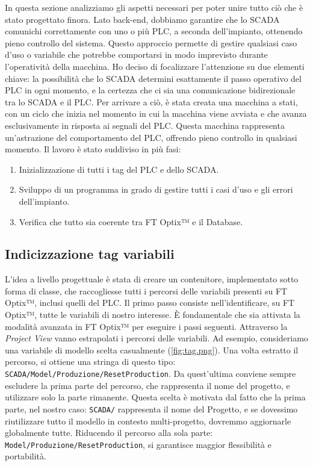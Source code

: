 In questa sezione analizziamo gli aspetti necessari per poter unire tutto ciò che è stato progettato finora. Lato back-end, dobbiamo garantire che lo SCADA comunichi correttamente con uno o più PLC, a seconda dell'impianto, ottenendo pieno controllo del sistema. Questo approccio permette di gestire qualsiasi caso d'uso o variabile che potrebbe comportarsi in modo imprevisto durante l'operatività della macchina. Ho deciso di focalizzare l'attenzione su due elementi chiave: la possibilità che lo SCADA determini esattamente il passo operativo del PLC in ogni momento, e la certezza che ci sia una comunicazione bidirezionale tra lo SCADA e il PLC. Per arrivare a ciò, è stata creata una macchina a stati, con un ciclo che inizia nel momento in cui la macchina viene avviata e che avanza esclusivamente in risposta ai segnali del PLC. Questa macchina rappresenta un'astrazione del comportamento del PLC, offrendo pieno controllo in qualsiasi momento. Il lavoro è stato suddiviso in più fasi:
\begin{enumerate}
    \item Inizializzazione di tutti i tag del PLC e dello SCADA.
    \item Sviluppo di un programma in grado di gestire tutti i casi d'uso e gli errori dell'impianto.
    \item Verifica che tutto sia coerente tra FT Optix™ e il Database.
\end{enumerate}

\subsection{Indicizzazione tag variabili}

L'idea a livello progettuale è stata di creare un contenitore, implementato sotto forma di classe, che raccogliesse tutti i percorsi delle variabili presenti su FT Optix™, inclusi quelli del PLC. Il primo passo consiste nell'identificare, su FT Optix™, tutte le variabili di nostro interesse. È fondamentale che sia attivata la modalità avanzata in FT Optix™ per eseguire i passi seguenti. Attraverso la \textit{Project View} vanno estrapolati i percorsi delle variabili. Ad esempio, consideriamo una variabile di modello scelta casualmente (\ref{fig:tag.png}). Una volta estratto il percorso, si ottiene una stringa di questo tipo: \verb|SCADA/Model/Produzione/ResetProduction|. Da quest'ultima conviene sempre escludere la prima parte del percorso, che rappresenta il nome del progetto, e utilizzare solo la parte rimanente. Questa scelta è motivata dal fatto che la prima parte, nel nostro caso: \verb|SCADA/| rappresenta il nome del Progetto, e se dovessimo riutilizzare tutto il modello in contesto multi-progetto, dovremmo aggiornarle globalmente tutte. Riducendo il percorso alla sola parte: \verb|Model/Produzione/ResetProduction|, si garantisce maggior flessibilità e portabilità. 


